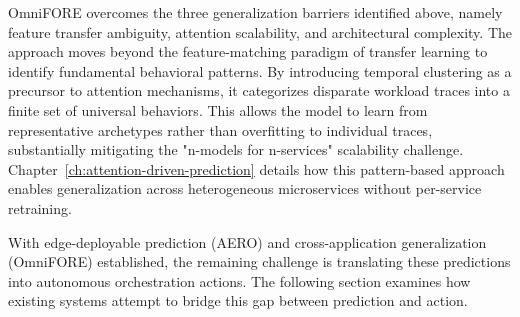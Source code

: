 \ac{OmniFORE} overcomes the three generalization barriers identified above, namely feature transfer ambiguity, attention scalability, and architectural complexity. The approach moves beyond the feature-matching paradigm of transfer learning to identify fundamental behavioral patterns. By introducing temporal clustering as a precursor to attention mechanisms, it categorizes disparate workload traces into a finite set of universal behaviors. This allows the model to learn from representative archetypes rather than overfitting to individual traces, substantially mitigating the "n-models for n-services" scalability challenge. Chapter~\ref{ch:attention-driven-prediction} details how this pattern-based approach enables generalization across heterogeneous microservices without per-service retraining.

With edge-deployable prediction (\ac{AERO}) and cross-application generalization (\ac{OmniFORE}) established, the remaining challenge is translating these predictions into autonomous orchestration actions. The following section examines how existing systems attempt to bridge this gap between prediction and action.